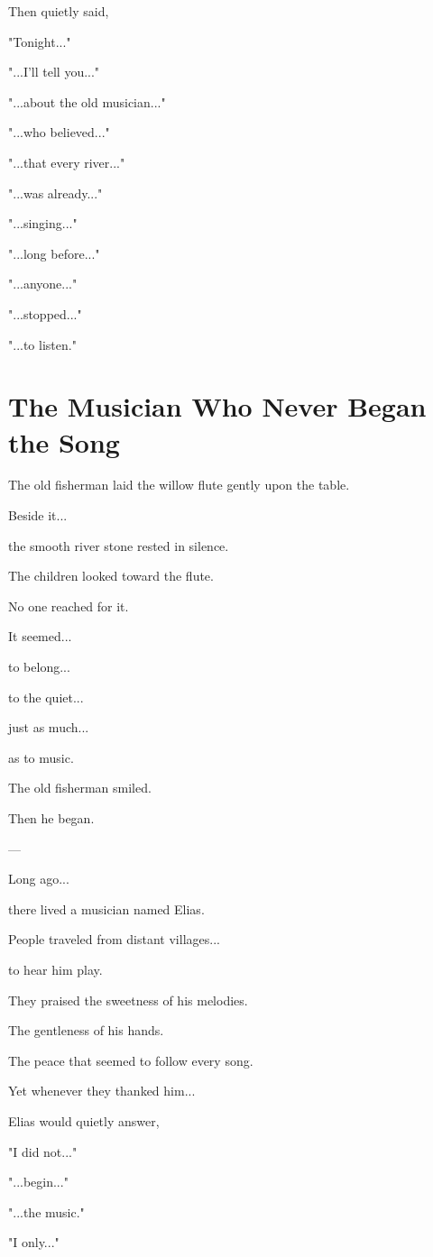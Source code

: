 \documentclass[12pt,openany]{book}
\begin{document}
Then quietly said,

"Tonight..."

"...I'll tell you..."

"...about the old musician..."

"...who believed..."

"...that every river..."

"...was already..."

"...singing..."

"...long before..."

"...anyone..."

"...stopped..."

"...to listen."
\section*{The Musician Who Never Began the Song}

The old fisherman laid the willow flute gently upon the table.

Beside it...

the smooth river stone rested in silence.

The children looked toward the flute.

No one reached for it.

It seemed...

to belong...

to the quiet...

just as much...

as to music.

The old fisherman smiled.

Then he began.

---

Long ago...

there lived a musician named Elias.

People traveled from distant villages...

to hear him play.

They praised the sweetness of his melodies.

The gentleness of his hands.

The peace that seemed to follow every song.

Yet whenever they thanked him...

Elias would quietly answer,

"I did not..."

"...begin..."

"...the music."

"I only..."
\end{document}
